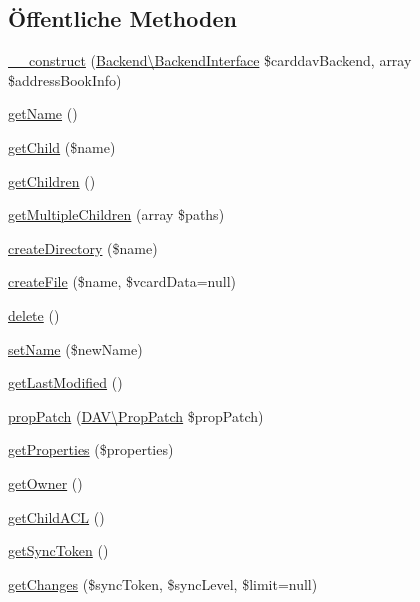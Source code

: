 \subsection*{Öffentliche Methoden}
\begin{DoxyCompactItemize}
\item 
\mbox{\hyperlink{class_sabre_1_1_card_d_a_v_1_1_address_book_a7d963d32490fa2a8495cadc491f4c964}{\+\_\+\+\_\+construct}} (\mbox{\hyperlink{interface_sabre_1_1_card_d_a_v_1_1_backend_1_1_backend_interface}{Backend\textbackslash{}\+Backend\+Interface}} \$carddav\+Backend, array \$address\+Book\+Info)
\item 
\mbox{\hyperlink{class_sabre_1_1_card_d_a_v_1_1_address_book_ae863b895bc101d7532edd8aa9ea40c4c}{get\+Name}} ()
\item 
\mbox{\hyperlink{class_sabre_1_1_card_d_a_v_1_1_address_book_aec8e795845ea7326b2fbe8198769e4cc}{get\+Child}} (\$name)
\item 
\mbox{\hyperlink{class_sabre_1_1_card_d_a_v_1_1_address_book_a0ce5bf311d7c56481966ddf34d2b2563}{get\+Children}} ()
\item 
\mbox{\hyperlink{class_sabre_1_1_card_d_a_v_1_1_address_book_a2075137110f456a965e38fdb3b254bb6}{get\+Multiple\+Children}} (array \$paths)
\item 
\mbox{\hyperlink{class_sabre_1_1_card_d_a_v_1_1_address_book_a0a262a569151f7c6ea00dab8b1eb6401}{create\+Directory}} (\$name)
\item 
\mbox{\hyperlink{class_sabre_1_1_card_d_a_v_1_1_address_book_acb96c33f5ef4268215b9d6c9bfcb46de}{create\+File}} (\$name, \$vcard\+Data=null)
\item 
\mbox{\hyperlink{class_sabre_1_1_card_d_a_v_1_1_address_book_a1bbb96f2d63e34d67c6172c0b3062376}{delete}} ()
\item 
\mbox{\hyperlink{class_sabre_1_1_card_d_a_v_1_1_address_book_a2a642797fd5aaf056145b4cde8301514}{set\+Name}} (\$new\+Name)
\item 
\mbox{\hyperlink{class_sabre_1_1_card_d_a_v_1_1_address_book_abf8ab182fe45132199d2ea8c1bbced13}{get\+Last\+Modified}} ()
\item 
\mbox{\hyperlink{class_sabre_1_1_card_d_a_v_1_1_address_book_a829e6b975824feba36708e77c7167bef}{prop\+Patch}} (\mbox{\hyperlink{class_sabre_1_1_d_a_v_1_1_prop_patch}{D\+A\+V\textbackslash{}\+Prop\+Patch}} \$prop\+Patch)
\item 
\mbox{\hyperlink{class_sabre_1_1_card_d_a_v_1_1_address_book_aea76f0a02701bda8632ec7bdfb0f3681}{get\+Properties}} (\$properties)
\item 
\mbox{\hyperlink{class_sabre_1_1_card_d_a_v_1_1_address_book_a305c57570d6a0434064deb1c3fa551f1}{get\+Owner}} ()
\item 
\mbox{\hyperlink{class_sabre_1_1_card_d_a_v_1_1_address_book_ab3e6477506aab37c658065d7a6fb6e3d}{get\+Child\+A\+CL}} ()
\item 
\mbox{\hyperlink{class_sabre_1_1_card_d_a_v_1_1_address_book_a64df90dc7a77af4028d9eb8ce6be0ffb}{get\+Sync\+Token}} ()
\item 
\mbox{\hyperlink{class_sabre_1_1_card_d_a_v_1_1_address_book_aa288c8012839af18a3f99ca4639b2f3b}{get\+Changes}} (\$sync\+Token, \$sync\+Level, \$limit=null)
\end{DoxyCompactItemize}
